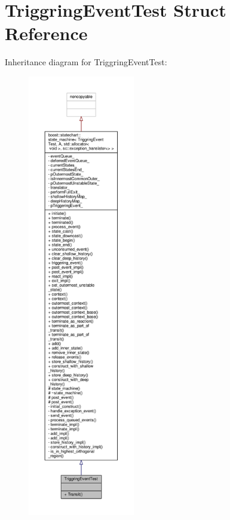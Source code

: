 \hypertarget{struct_triggring_event_test}{}\section{Triggring\+Event\+Test Struct Reference}
\label{struct_triggring_event_test}


Inheritance diagram for Triggring\+Event\+Test\+:
\nopagebreak
\begin{figure}[H]
\begin{center}
\leavevmode
\includegraphics[height=550pt]{struct_triggring_event_test__inherit__graph}
\end{center}
\end{figure}


